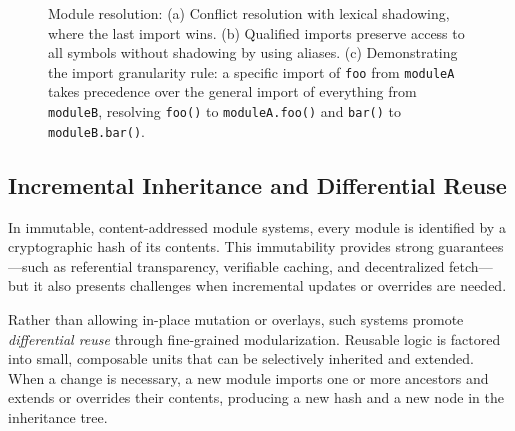 \documentclass[sigplan,screen]{acmart}
\begin{document}
\begin{figure}[t]
\begin{tikzpicture}
\end{tikzpicture}

\vspace{1cm}  %

\caption{Module resolution: (a) Conflict resolution with lexical shadowing, where the last import wins. (b) Qualified imports preserve access to all symbols without shadowing by using aliases. (c) Demonstrating the import granularity rule: a specific import of \texttt{foo} from \texttt{moduleA} takes precedence over the general import of everything from \texttt{moduleB}, resolving \texttt{foo()} to \texttt{moduleA.foo()} and \texttt{bar()} to \texttt{moduleB.bar()}.}
\label{fig:module-resolution}
\end{figure}

\subsection{Incremental Inheritance and Differential Reuse}
\label{sec:incremental-inheritance-differential-reuse}

In immutable, content-addressed module systems, every module is identified by a cryptographic hash of its contents. This immutability provides strong guarantees—such as referential transparency, verifiable caching, and decentralized fetch—but it also presents challenges when incremental updates or overrides are needed.

Rather than allowing in-place mutation or overlays, such systems promote \emph{differential reuse} through fine-grained modularization. Reusable logic is factored into small, composable units that can be selectively inherited and extended. When a change is necessary, a new module imports one or more ancestors and extends or overrides their contents, producing a new hash and a new node in the inheritance tree.
\end{document}
